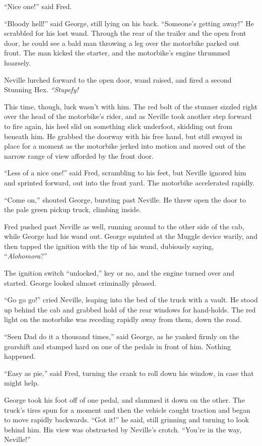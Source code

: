 ``Nice one!'' said Fred.

``Bloody hell!'' said George, still lying on his back. ``Someone's
getting away!'' He scrabbled for his lost wand. Through the rear of the
trailer and the open front door, he could see a bald man throwing a leg
over the motorbike parked out front. The man kicked the starter, and the
motorbike's engine thrummed hoarsely.

Neville lurched forward to the open door, wand raised, and fired a
second Stunning Hex. \emph{``Stupefy!}

This time, though, luck wasn't with him. The red bolt of the stunner
sizzled right over the head of the motorbike's rider, and as Neville
took another step forward to fire again, his heel slid on something
slick underfoot, skidding out from beneath him. He grabbed the doorway
with his free hand, but still swayed in place for a moment as the
motorbike jerked into motion and moved out of the narrow range of view
afforded by the front door.

``Less of a nice one!'' said Fred, scrambling to his feet, but Neville
ignored him and sprinted forward, out into the front yard. The motorbike
accelerated rapidly.

``Come on,'' shouted George, bursting past Neville. He threw open the
door to the pale green pickup truck, climbing inside.

Fred pushed past Neville as well, running around to the other side of
the cab, while George had his wand out. George squinted at the Muggle
device warily, and then tapped the ignition with the tip of his wand,
dubiously saying, ``\emph{Alohomora}?''

The ignition switch ``unlocked,'' key or no, and the engine turned over
and started. George looked almost criminally pleased.

``Go go go!'' cried Neville, leaping into the bed of the truck with a
vault. He stood up behind the cab and grabbed hold of the rear windows
for hand-holds. The red light on the motorbike was receding rapidly away
from them, down the road.

``Seen Dad do it a thousand times,'' said George, as he yanked firmly on
the gearshift and stamped hard on one of the pedals in front of him.
Nothing happened.

``Easy as pie,'' said Fred, turning the crank to roll down his window,
in case that might help.

George took his foot off of one pedal, and slammed it down on the other.
The truck's tires spun for a moment and then the vehicle caught traction
and began to move rapidly backwards. ``Got it!'' he said, still grinning
and turning to look behind him. His view was obstructed by Neville's
crotch. ``You're in the way, Neville!''

